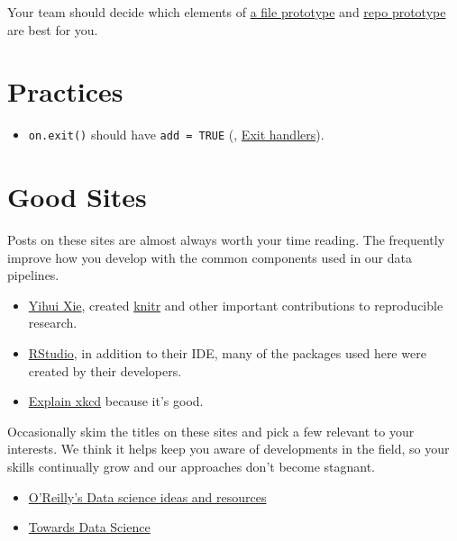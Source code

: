 \documentclass[
]{book}
\providecommand{\tightlist}{%
  \setlength{\itemsep}{0pt}\setlength{\parskip}{0pt}}
\begin{document}
\begin{enumerate}
  Your team should decide which elements of \href{https://ouhscbbmc.github.io/data-science-practices-1/file-prototype-r.html}{a file prototype} and \href{https://ouhscbbmc.github.io/data-science-practices-1/repo-prototype.html}{repo prototype} are best for you.
\end{enumerate}

\hypertarget{practices}{%
\section{Practices}\label{practices}}

\begin{itemize}
\tightlist
\item
  \texttt{on.exit()} should have \texttt{add\ =\ TRUE} (\citet{wickham-advanced-r}, \href{https://adv-r.hadley.nz/functions.html\#on-exit}{Exit handlers}).
\end{itemize}

\hypertarget{good-sites}{%
\section{Good Sites}\label{good-sites}}

Posts on these sites are almost always worth your time reading. The frequently improve how you develop with the common components used in our data pipelines.

\begin{itemize}
\tightlist
\item
  \href{https://yihui.org/en/}{Yihui Xie}, created \href{https://yihui.org/knitr/}{knitr} and other important contributions to reproducible research.
\item
  \href{https://blog.rstudio.com/}{RStudio}, in addition to their IDE, many of the packages used here were created by their developers.
\item
  \href{www.explainxkcd.com}{Explain xkcd} because it's good.
\end{itemize}

Occasionally skim the titles on these sites and pick a few relevant to your interests. We think it helps keep you aware of developments in the field, so your skills continually grow and our approaches don't become stagnant.

\begin{itemize}
\tightlist
\item
  \href{https://www.oreilly.com/topics/data-science}{O'Reilly's Data science ideas and resources}
\item
  \href{https://towardsdatascience.com/}{Towards Data Science}
\end{itemize}
\end{document}
